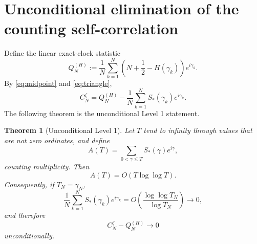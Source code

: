 \documentclass[11pt]{article}
\newtheorem{theorem}{Theorem}[section]
\theoremstyle{definition}
\theoremstyle{remark}
\begin{document}
\section{Unconditional elimination of the counting self-correlation}\label{sec:level1}

Define the linear exact-clock statistic
\begin{equation}\label{eq:QH}
Q_N^{(H)}
:=\frac1N\sum_{k=1}^N
\left(N+\frac12-H(\gamma_k)\right)e^{i\gamma_k}.
\end{equation}
By \eqref{eq:midpoint} and \eqref{eq:triangle},
\begin{equation}\label{eq:exactCQ}
\boxed{
C_N^{\zeta}=Q_N^{(H)}-\frac1N\sum_{k=1}^N S_*(\gamma_k)e^{i\gamma_k}.
}
\end{equation}
The following theorem is the unconditional Level 1 statement.

\begin{theorem}[Unconditional Level 1]\label{thm:level1}
Let $T$ tend to infinity through values that are not zero ordinates, and define
\[
A(T)=\sum_{0<\gamma\le T}S_*(\gamma)e^{i\gamma},
\]
counting multiplicity.  Then
\begin{equation}\label{eq:ATbound}
A(T)=O(T\log\log T).
\end{equation}
Consequently, if $T_N=\gamma_N$,
\begin{equation}\label{eq:level1rate}
\boxed{
\frac1N\sum_{k=1}^N S_*(\gamma_k)e^{i\gamma_k}
=O\!\left(\frac{\log\log T_N}{\log T_N}\right)\longrightarrow0,
}
\end{equation}
and therefore
\begin{equation}\label{eq:CQlimit}
\boxed{C_N^{\zeta}-Q_N^{(H)}\longrightarrow0}
\end{equation}
unconditionally.
\end{theorem}
\end{document}
